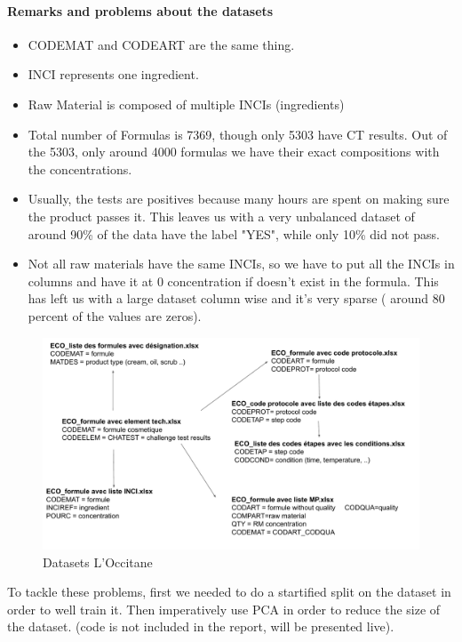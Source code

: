 \documentclass[a4paper,12pt,twoside]{report}
\begin{document}
\paragraph{Remarks and problems about the datasets}
\begin{itemize} 
\item CODEMAT and CODEART are the same thing.
\item INCI represents one ingredient.
\item Raw Material is composed of multiple INCIs (ingredients)
\item Total number of Formulas is 7369, though only 5303 have CT results. Out of the 5303, only around 4000 formulas we have their exact compositions with the concentrations. 
\item Usually, the tests are positives because many hours are spent on making sure the product passes it. This leaves us with a very unbalanced dataset of around 90\% of the data have the label "YES", while only 10\% did not pass.
\item Not all raw materials have the same INCIs, so we have to put all the INCIs in columns and have it at 0 concentration if doesn't exist in the formula. This has left us with a large dataset column wise and it's very sparse ( around 80 percent of the values are zeros).
\end{itemize}
\begin{figure}[H]
		\includegraphics[width=\textwidth]{images/MCD_CT}
	\caption[MCD for L'Occiatane]{Datasets L'Occitane}
\label{MCD Challenge Test}
\end{figure}
To tackle these problems, first we needed to do a startified split on the dataset in order to well train it. Then imperatively use PCA in order to reduce the size of the dataset.
(code is not included in the report, will be presented live).
\end{document}

